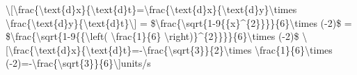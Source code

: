 \textbackslash{[}\textbackslash frac\{\textbackslash text\{d\}x\}\{\textbackslash text\{d\}t\}=\textbackslash frac\{\textbackslash text\{d\}x\}\{\textbackslash text\{d\}y\}\textbackslash times
\textbackslash frac\{\textbackslash text\{d\}y\}\{\textbackslash text\{d\}t\}\textbackslash{]}
= \$\textbackslash frac\{\textbackslash sqrt\{1-9\{\{x\}\textasciicircum\{2\}\}\}\}\{6\}\textbackslash times
(-2)\$ = \$\textbackslash frac\{\textbackslash sqrt\{1-9\{\{\textbackslash left(
\textbackslash frac\{1\}\{6\} \textbackslash right)\}\textasciicircum\{2\}\}\}\}\{6\}\textbackslash times
(-2)\$ \textbackslash{[}\textbackslash frac\{\textbackslash text\{d\}x\}\{\textbackslash text\{d\}t\}=-\textbackslash frac\{\textbackslash sqrt\{3\}\}\{2\}\textbackslash times
\textbackslash frac\{1\}\{6\}\textbackslash times (-2)=-\textbackslash frac\{\textbackslash sqrt\{3\}\}\{6\}\textbackslash{]}units/s
